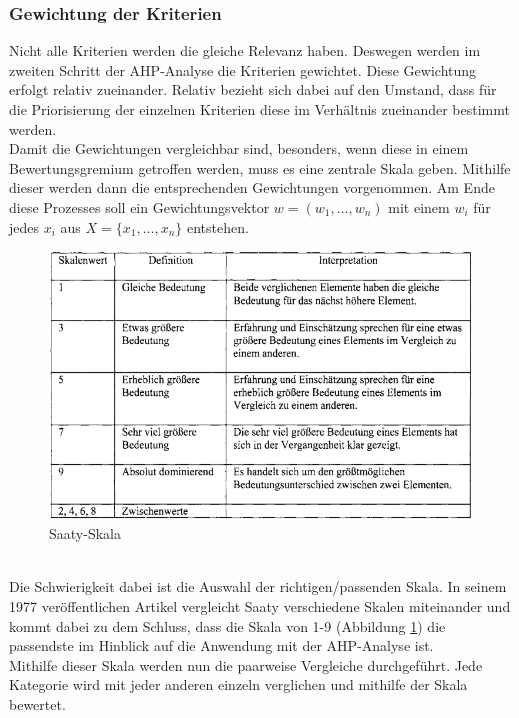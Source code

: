 \subsubsection{Gewichtung der Kriterien}
Nicht alle Kriterien werden die gleiche Relevanz haben. Deswegen werden im zweiten Schritt der AHP-Analyse die Kriterien gewichtet.\autocite[Vgl.][S.9]{Mu.2018} Diese Gewichtung erfolgt relativ zueinander. Relativ bezieht sich dabei auf den Umstand, dass für die Priorisierung der einzelnen Kriterien diese im Verhältnis zueinander bestimmt werden. \\
Damit die Gewichtungen vergleichbar sind, besonders, wenn diese in einem Bewertungsgremium getroffen werden, muss es eine zentrale Skala geben. Mithilfe dieser werden dann die entsprechenden Gewichtungen vorgenommen. Am Ende diese Prozesses soll ein Gewichtungsvektor $w=(w_{1}, ..., w_{n})$ mit einem $w_i$ für jedes $x_i$ aus $X=\{x_{1}, ..., x_{n}\}$ entstehen\autocite[Vgl.][S.4]{Brunelli.2015}.
\begin{figure}[h!]
	\centering
	\includegraphics[scale = 0.8]{img/Skala.png}
	\caption{Saaty-Skala}
	\label{img:scale}
\end{figure}\\
Die Schwierigkeit dabei ist die Auswahl der richtigen/passenden Skala. In seinem 1977 veröffentlichen Artikel\autocite{Saaty.1977} vergleicht Saaty verschiedene Skalen miteinander und kommt dabei zu dem Schluss, dass die Skala von 1-9 (Abbildung \ref{img:scale}) die passendste im Hinblick auf die Anwendung mit der AHP-Analyse ist. \\
Mithilfe dieser Skala werden nun die paarweise Vergleiche durchgeführt. Jede Kategorie wird mit jeder anderen einzeln verglichen und mithilfe der Skala bewertet.\autocite[Vgl.][S.106]{Fink.2006}  

